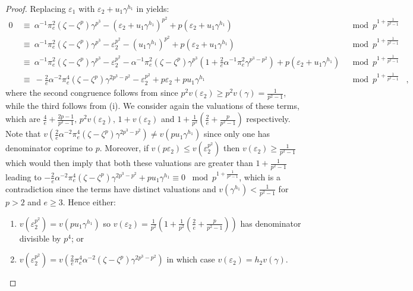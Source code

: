 \documentclass{amsart}
\theoremstyle{definition}
\numberwithin{theorem}{section}
\numberwithin{equation}{section}
\begin{document}
\begin{proof}
    Replacing $\varepsilon_1$ with $\varepsilon_2+u_1\gamma^{h_1}$ in  yields:
    \begin{align*}
        0 \ &\equiv \ \alpha^{-1}\pi_e^2(\zeta-\zeta^p)\gamma^{p^3} - (\varepsilon_2+u_1\gamma^{h_1})^{p^2} + p(\varepsilon_2+u_1\gamma^{h_1}) & \mod p^{1+\frac{1}{p^2-1}} \\
        &\equiv \ \alpha^{-1}\pi_e^2(\zeta-\zeta^p)\gamma^{p^3} - \varepsilon_2^{p^2} - (u_1\gamma^{h_1})^{p^2} + p(\varepsilon_2+u_1\gamma^{h_1}) & \mod p^{1+\frac{1}{p^2-1}} \\
        &\equiv \ \alpha^{-1}\pi_e^2(\zeta-\zeta^p)\gamma^{p^3} - \varepsilon_2^{p^2} - \alpha^{-1}\pi_e^2(\zeta-\zeta^p)\gamma^{p^3}\left(1+\tfrac{2}{e}\alpha^{-1}\pi_e^2\gamma^{p^3-p^2}\right) + p(\varepsilon_2+u_1\gamma^{h_1}) & \mod p^{1+\frac{1}{p^2-1}} \\
        &\equiv \ -\tfrac{2}{e}\alpha^{-2}\pi_e^4(\zeta-\zeta^p)\gamma^{2p^3-p^2} - \varepsilon_2^{p^2} +p\varepsilon_2 +pu_1\gamma^{h_1} & \mod p^{1+\frac{1}{p^2-1}}&,
    \end{align*}
    where the second congruence follows from  since $p^2v(\varepsilon_2)\geq p^2v(\gamma) = \frac{1}{p^2-1}$, while the third follows from (i).
    We consider again the valuations of these terms, which are $\frac{4}{e} {+} \frac{2p-1}{p^2-1}, \, p^2v(\varepsilon_2), \, 1{+}v(\varepsilon_2)$ and $1{+}\frac{1}{p^2}(\frac{2}{e}{+}\frac{p}{p^2-1})$ respectively. Note that $v(\tfrac{2}{e}\alpha^{-2}\pi_e^4(\zeta-\zeta^p)\gamma^{2p^3-p^2}) \neq v(pu_1\gamma^{h_1})$ since only one has denominator coprime to $p$.
    Moreover, if $v(p\varepsilon_2) \leq v(\varepsilon_2^{p^2})$ then $v(\varepsilon_2) \geq \frac{1}{p^2-1}$ which would then imply that both these valuations are greater than $1+\frac{1}{p^2-1}$ leading to $-\tfrac{2}{e}\alpha^{-2}\pi_e^4(\zeta-\zeta^p)\gamma^{2p^3-p^2} +pu_1\gamma^{h_1} \equiv 0 \,\, \bmod{p^{1+\frac{1}{p^2-1}}}$, which is a contradiction since the terms have distinct valuations and $v(\gamma^{h_1}) < \frac{1}{p^2-1}$ for $p > 2$ and $e \geq 3$.
    Hence either:
    \begin{enumerate}
    \item $v(\varepsilon_2^{p^2})=v(pu_1\gamma^{h_1})$ so $v(\varepsilon_2)=\frac{1}{p^2}(1+\frac{1}{p^2}(\frac{2}{e} + \frac{p}{p^2-1}))$ has denominator divisible by $p^4$; or
    \item $v(\varepsilon_2^{p^2})=v(\tfrac{2}{e}\pi_e^4\alpha^{-2}(\zeta-\zeta^p)\gamma^{2p^3-p^2})$ in which case $v(\varepsilon_2)=h_2v(\gamma)$.

\end{enumerate}
\end{proof}
\end{document}
